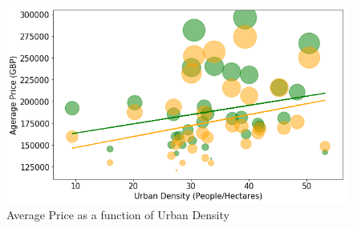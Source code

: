 \documentclass{homeworg}
\begin{document}
\begin{figure}[!h]
    \centering
    \includegraphics[scale=0.6]{figure/Figure_6_Not_so_Obvious_UrbanDensityVSAveragePrice.png}
    \caption{Average Price as a function of Urban Density}
    \label{fig:fig6}
\end{figure}
\FloatBarrier
\end{document}
